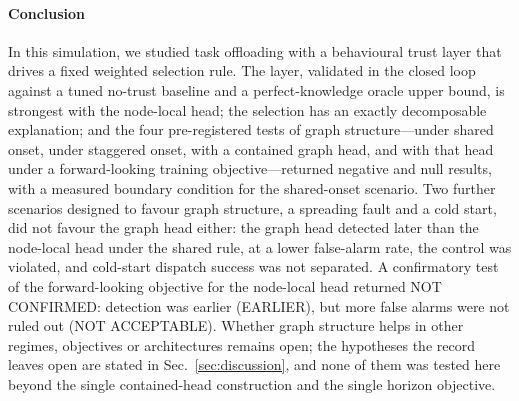 \paragraph*{Conclusion}
In this simulation, we studied task offloading with a behavioural trust layer that drives a fixed weighted selection rule.
The layer, validated in the closed loop against a tuned no-trust baseline and a perfect-knowledge oracle upper bound, is strongest with the node-local head; the selection has an exactly decomposable explanation; and the four pre-registered tests of graph structure---under shared onset, under staggered onset, with a contained graph head, and with that head under a forward-looking training objective---returned negative and null results, with a measured boundary condition for the shared-onset scenario.
Two further scenarios designed to favour graph structure, a spreading fault and a cold start, did not favour the graph head either: the graph head detected later than the node-local head under the shared rule, at a lower false-alarm rate, the control was violated, and cold-start dispatch success was not separated.
A confirmatory test of the forward-looking objective for the node-local head returned NOT CONFIRMED: detection was earlier (EARLIER), but more false alarms were not ruled out (NOT ACCEPTABLE).
\latcaveat
Whether graph structure helps in other regimes, objectives or architectures remains open; the hypotheses the record leaves open are stated in Sec.~\ref{sec:discussion}, and none of them was tested here beyond the single contained-head construction and the single horizon objective.
